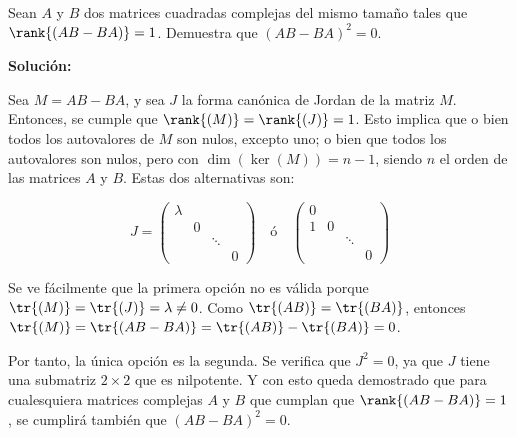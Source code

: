 \documentclass[../../main.tex]{subfiles}
\begin{document}
  \begin{shaded}
    Sean $A$ y $B$ dos matrices cuadradas complejas del mismo tamaño tales que $\rank{(A B - B A)} = 1$. Demuestra que $(A B - B A)^2 = 0$.
  \end{shaded}

  \textbf{Solución:}

  Sea $M = A B - B A$, y sea $J$ la forma canónica de Jordan de la matriz $M$. Entonces, se cumple que $\rank{(M)} = \rank{(J)} = 1$. Esto implica que o bien todos los autovalores de $M$ son nulos, excepto uno; o bien que todos los autovalores son nulos, pero con $\dim{(\ker{(M)})} = n - 1$, siendo $n$ el orden de las matrices $A$ y $B$. Estas dos alternativas son:

  $$
  J = \left(
    \begin{matrix}
      \lambda &   &        &   \\
              & 0 &        &   \\
              &   & \ddots &   \\
              &   &        & 0
    \end{matrix}
  \right)
  \quad
  \text{ó}
  \quad
  \left(
    \begin{matrix}
      0 &   &        &   \\
      1 & 0 &        &   \\
        &   & \ddots &   \\
        &   &        & 0
    \end{matrix}
  \right)
  $$

  Se ve fácilmente que la primera opción no es válida porque $\tr{(M)} = \tr{(J)} = \lambda \ne 0$. Como $\tr{(A B)} = \tr{(B A)}$, entonces $\tr{(M)} = \tr{(A B - B A)} = \tr{(A B)} - \tr{(B A)} = 0$.

  Por tanto, la única opción es la segunda. Se verifica que $J^2 = 0$, ya que $J$ tiene una submatriz $2 \times 2$ que es nilpotente. Y con esto queda demostrado que para cualesquiera matrices complejas $A$ y $B$ que cumplan que $\rank{(A B - B A)} = 1$, se cumplirá también que $(A B - B A)^2 = 0$.
\end{document}

